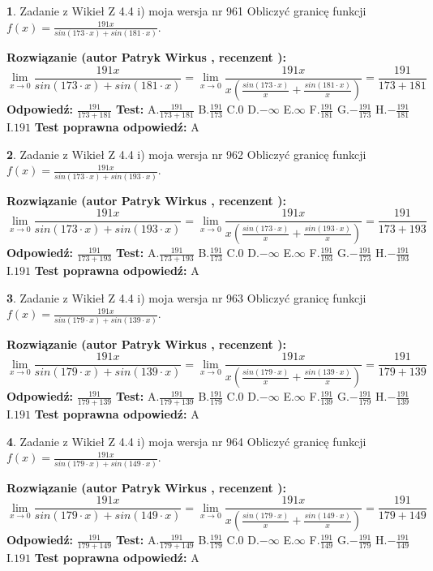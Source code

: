 \documentclass[12pt, a4paper]{article}
\theoremstyle{definition} %
\newtheorem{zad}{}
\newcommand{\zadStart}[1]{\begin{zad}#1\newline}
\newcommand{\zadStop}{\end{zad}}
\newcommand{\rozwStart}[2]{\noindent \textbf{Rozwiązanie (autor #1 , recenzent #2): }\newline}
\newcommand{\rozwStop}{\newline}
\newcommand{\odpStart}{\noindent \textbf{Odpowiedź:}\newline}
\newcommand{\odpStop}{\newline}
\newcommand{\testStart}{\noindent \textbf{Test:}\newline}
\newcommand{\testStop}{\newline}
\newcommand{\kluczStart}{\noindent \textbf{Test poprawna odpowiedź:}\newline}
\newcommand{\kluczStop}{\newline}
\begin{document}
\zadStart{Zadanie z Wikieł Z 4.4 i) moja wersja nr 961}
Obliczyć granicę funkcji $f(x)=\frac{191x}{sin(173\cdot x) +sin(181\cdot x)}$.
\zadStop
\rozwStart{Patryk Wirkus}{}
$$\lim\limits_{x\to 0}\frac{191x}{sin(173\cdot x) +sin(181\cdot x)}=\lim\limits_{x\to 0}\frac{191x}{x(\frac{sin(173\cdot x)}{x}+\frac{sin(181\cdot x)}{x})}=\frac{191}{173+181}$$
\rozwStop
\odpStart
$\frac{191}{173+181}$
\odpStop
\testStart
A.$\frac{191}{173+181}$
B.$\frac{191}{173}$
C.$0$
D.$-\infty$
E.$\infty$
F.$\frac{191}{181}$
G.$-\frac{191}{173}$
H.$-\frac{191}{181}$
I.$191$
\testStop
\kluczStart
A
\kluczStop



\zadStart{Zadanie z Wikieł Z 4.4 i) moja wersja nr 962}
Obliczyć granicę funkcji $f(x)=\frac{191x}{sin(173\cdot x) +sin(193\cdot x)}$.
\zadStop
\rozwStart{Patryk Wirkus}{}
$$\lim\limits_{x\to 0}\frac{191x}{sin(173\cdot x) +sin(193\cdot x)}=\lim\limits_{x\to 0}\frac{191x}{x(\frac{sin(173\cdot x)}{x}+\frac{sin(193\cdot x)}{x})}=\frac{191}{173+193}$$
\rozwStop
\odpStart
$\frac{191}{173+193}$
\odpStop
\testStart
A.$\frac{191}{173+193}$
B.$\frac{191}{173}$
C.$0$
D.$-\infty$
E.$\infty$
F.$\frac{191}{193}$
G.$-\frac{191}{173}$
H.$-\frac{191}{193}$
I.$191$
\testStop
\kluczStart
A
\kluczStop



\zadStart{Zadanie z Wikieł Z 4.4 i) moja wersja nr 963}
Obliczyć granicę funkcji $f(x)=\frac{191x}{sin(179\cdot x) +sin(139\cdot x)}$.
\zadStop
\rozwStart{Patryk Wirkus}{}
$$\lim\limits_{x\to 0}\frac{191x}{sin(179\cdot x) +sin(139\cdot x)}=\lim\limits_{x\to 0}\frac{191x}{x(\frac{sin(179\cdot x)}{x}+\frac{sin(139\cdot x)}{x})}=\frac{191}{179+139}$$
\rozwStop
\odpStart
$\frac{191}{179+139}$
\odpStop
\testStart
A.$\frac{191}{179+139}$
B.$\frac{191}{179}$
C.$0$
D.$-\infty$
E.$\infty$
F.$\frac{191}{139}$
G.$-\frac{191}{179}$
H.$-\frac{191}{139}$
I.$191$
\testStop
\kluczStart
A
\kluczStop



\zadStart{Zadanie z Wikieł Z 4.4 i) moja wersja nr 964}
Obliczyć granicę funkcji $f(x)=\frac{191x}{sin(179\cdot x) +sin(149\cdot x)}$.
\zadStop
\rozwStart{Patryk Wirkus}{}
$$\lim\limits_{x\to 0}\frac{191x}{sin(179\cdot x) +sin(149\cdot x)}=\lim\limits_{x\to 0}\frac{191x}{x(\frac{sin(179\cdot x)}{x}+\frac{sin(149\cdot x)}{x})}=\frac{191}{179+149}$$
\rozwStop
\odpStart
$\frac{191}{179+149}$
\odpStop
\testStart
A.$\frac{191}{179+149}$
B.$\frac{191}{179}$
C.$0$
D.$-\infty$
E.$\infty$
F.$\frac{191}{149}$
G.$-\frac{191}{179}$
H.$-\frac{191}{149}$
I.$191$
\testStop
\kluczStart
A
\kluczStop
\end{document}
